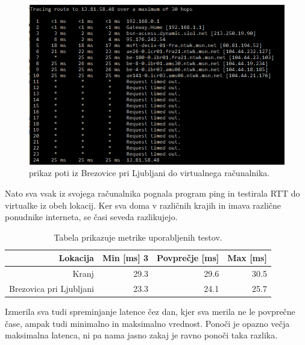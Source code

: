 \begin{figure}[H]
    \centering
    \includegraphics[scale=0.5]{Img/traceroute2.png}
    \caption{prikaz poti iz Brezovice pri Ljubljani do virtualnega računalnika.}
    \label{fig:6_traceroute2}
\end{figure}

Nato sva vsak iz svojega računalnika pognala program ping in testirala RTT do virtualke iz obeh lokacij. Ker sva doma v različnih krajih in imava različne ponudnike interneta, se časi seveda razlikujejo.
\begin{table}[H]
	\centering
	\begin{tabular}{ | r | r | r | r |} 
		\hline
		Lokacija & Min [ms] 3 & Povprečje [ms] & Max [ms]  \\
		\hline
		Kranj & 29.3 & 29.6 & 30.5  \\
		Brezovica pri Ljubljani & 23.3 & 24.1 & 25.7  \\
		\hline
	\end{tabular}
	\caption{Tabela prikazuje metrike uporabljenih testov.}
	\label{table:1_chunks}
\end{table}

Izmerila sva tudi spreminjanje latence čez dan, kjer sva merila ne le povprečne čase, ampak tudi minimalno in maksimalno vrednost. Ponoči je opazno večja maksimalna latenca, ni pa nama jasno zakaj je ravno ponoči taka razlika.

